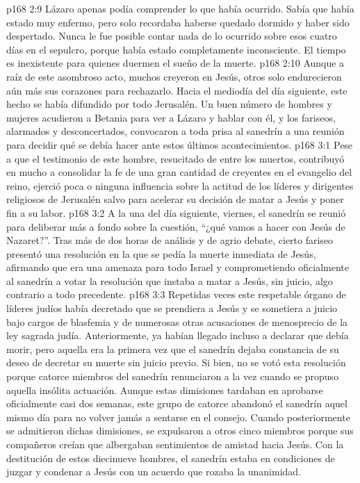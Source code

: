 \vs p168 2:9 \pc Lázaro apenas podía comprender lo que había ocurrido. Sabía que había estado muy enfermo, pero solo recordaba haberse quedado dormido y haber sido despertado. Nunca le fue posible contar nada de lo ocurrido sobre esos cuatro días en el sepulcro, porque había estado completamente inconsciente. El tiempo es inexistente para quienes duermen el sueño de la muerte.
\vs p168 2:10 Aunque a raíz de este asombroso acto, muchos creyeron en Jesús, otros solo endurecieron aún más sus corazones para rechazarlo. Hacia el mediodía del día siguiente, este hecho se había difundido por todo Jerusalén. Un buen número de hombres y mujeres acudieron a Betania para ver a Lázaro y hablar con él, y los fariseos, alarmados y desconcertados, convocaron a toda prisa al sanedrín a una reunión para decidir qué se debía hacer ante estos últimos acontecimientos.
\vs p168 3:1 Pese a que el testimonio de este hombre, resucitado de entre los muertos, contribuyó en mucho a consolidar la fe de una gran cantidad de creyentes en el evangelio del reino, ejerció poca o ninguna influencia sobre la actitud de los líderes y dirigentes religiosos de Jerusalén salvo para acelerar su decisión de matar a Jesús y poner fin a su labor.
\vs p168 3:2 \pc A la una del día siguiente, viernes, el sanedrín se reunió para deliberar más a fondo sobre la cuestión, “¿qué vamos a hacer con Jesús de Nazaret?”. Tras más de dos horas de análisis y de agrio debate, cierto fariseo presentó una resolución en la que se pedía la muerte inmediata de Jesús, afirmando que era una amenaza para todo Israel y comprometiendo oficialmente al sanedrín a votar la resolución que instaba a matar a Jesús, sin juicio, algo contrario a todo precedente.
\vs p168 3:3 Repetidas veces este respetable órgano de líderes judíos había decretado que se prendiera a Jesús y se sometiera a juicio bajo cargos de blasfemia y de numerosas otras acusaciones de menosprecio de la ley sagrada judía. Anteriormente, ya habían llegado incluso a declarar que debía morir, pero aquella era la primera vez que el sanedrín dejaba constancia de su deseo de decretar su muerte sin juicio previo. Si bien, no se votó esta resolución porque catorce miembros del sanedrín renunciaron a la vez cuando se propuso aquella insólita actuación. Aunque estas dimisiones tardaban en aprobarse oficialmente casi dos semanas, este grupo de catorce abandonó el sanedrín aquel mismo día para no volver jamás a sentarse en el consejo. Cuando posteriormente se admitieron dichas dimisiones, se expulsaron a otros cinco miembros porque sus compañeros creían que albergaban sentimientos de amistad hacia Jesús. Con la destitución de estos diecinueve hombres, el sanedrín estaba en condiciones de juzgar y condenar a Jesús con un acuerdo que rozaba la unanimidad.
